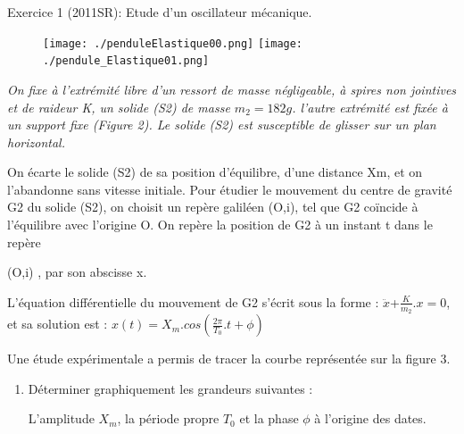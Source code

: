 \documentclass[12pt, french]{article}
\begin{document}
\begin{center}

\end{center}

\vspace{-0.2cm}
   \begin{Box2}{Exercice 1 (2011SR): Etude d’un oscillateur mécanique.}

	\begin{figure}
  \begin{center}
	  \vspace{-0.6cm}
	\texttt{[image: ./penduleElastique00.png]}
	\texttt{[image: ./pendule\_Elastique01.png]}
  \end{center}
\end{figure}

\emph{On fixe à l’extrémité libre d’un ressort de masse
négligeable, à spires non jointives et de raideur K,
un solide (S2) de masse $m_2 = 182 g$. l’autre
extrémité est fixée à un support fixe (Figure 2).
Le solide (S2) est susceptible de glisser sur un plan
horizontal. }

On écarte le solide (S2) de sa position d’équilibre, d’une distance Xm, et on
l’abandonne sans vitesse initiale.
Pour étudier le mouvement du centre de gravité G2 du solide (S2), on choisit un repère
galiléen
(O,i), tel que G2 coïncide à l’équilibre avec l’origine O.
On repère la position de G2 à un instant t dans le repère

(O,i) , par son abscisse x.

L’équation différentielle du mouvement de G2
s’écrit sous la forme : $\ddot{x}$+$\frac{K}{m_2}.x = 0$, et sa solution
     est : $x(t) = X_m.cos(\frac{2\pi}{T_0}.t + \phi)$

     Une étude expérimentale a permis de tracer la
courbe représentée sur la figure 3.
\begin{enumerate}
  \item Déterminer graphiquement les
grandeurs suivantes :

    L’amplitude $X_m$, la période propre $T_0$ et la phase
$\phi$ à l’origine des dates.


\end{enumerate}
\end{Box2}
\end{document}
